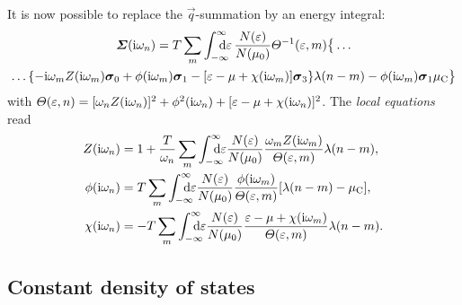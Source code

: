 It is now possible to replace the $\vec q$-summation by an energy integral:
%
\begin{multline} \label{local self-energy}
    \vec \Sigma(\I \omega_n)
    = T \sum_m \int \from{-\infty} \till \infty \D \epsilon \,
    \frac{N(\epsilon)}{N(\mu_0)}
    \Theta^{-1}(\epsilon, m) \big \{ \dots
        \\
        \dots \{
            - \I \omega_m Z(\I \omega_m) \vec \sigma_0
            + \phi(\I \omega_m) \vec \sigma_1
            - [\epsilon - \mu + \chi(\I \omega_m)] \vec \sigma_3
            \}
        \lambda(n - m) - \phi(\I \omega_m) \vec \sigma_1 \mu \sub C
    \big \}
\end{multline}
%
with $\varTheta(\varepsilon, n) = [\omega_n Z(\mathrm i \omega_n)]^2 + \phi^2(\mathrm i \omega_n) +
[\varepsilon - \mu + \chi(\mathrm i \omega_n)]^2$. The \emph{local 
equations} read
%
\begin{subequations} \label{local Eliashberg equations}
    \begin{align}
        Z(\I \omega_n) &= 1 + \frac T {\omega_n} \sum_m
        \int \from{-\infty} \till \infty \D \epsilon
        \frac{N(\epsilon)}{N(\mu_0)}
        \frac{\omega_m Z(\I \omega_m)}{\Theta(\epsilon, m)}
        \lambda(n - m),
        \\
        \phi(\I \omega_n) &= T \sum_m
        \int \from{-\infty} \till \infty \D \epsilon
        \frac{N(\epsilon)}{N(\mu_0)}
        \frac{\phi(\I \omega_m)}{\Theta(\epsilon, m)}
        [\lambda(n - m) - \mu \sub C],
        \\
        \chi(\I \omega_n) &= -T \sum_m
        \int \from{-\infty} \till \infty \D \epsilon
        \frac{N(\epsilon)}{N(\mu_0)}
        \frac{\epsilon - \mu + \chi(\I \omega_m)}{\Theta(\epsilon, m)}
        \lambda(n - m).
    \end{align}
\end{subequations}

\subsection{Constant density of states}

